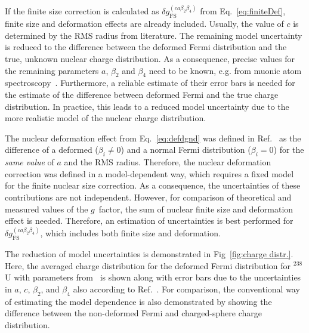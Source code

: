 If the finite size correction is calculated as $\delta g^{(ca\beta_2\beta_4)}_{\text{FS}}$ from Eq.~\eqref{eq:finiteDef}, finite size and deformation effects are already included. Usually, the value of $c$ is determined by the RMS radius from literature. The remaining model uncertainty is reduced to the difference between the deformed Fermi distribution and the true, unknown nuclear charge distribution. As a consequence, precise values for the remaining parameters $a$, $\beta_2$ and $\beta_4$ need to be known, e.g. from muonic atom spectroscopy~\cite{Close1978,hitlin1970}. Furthermore, a reliable estimate of their error bars is needed for the estimate of the difference between deformed Fermi and the true charge distribution. In practice, this leads to a reduced model uncertainty due to the more realistic model of the nuclear charge distribution.

The nuclear deformation effect from Eq.~\eqref{eq:defdgnd} was defined in Ref.~\cite{jacek2012} as the difference of a deformed ($\beta_i \neq 0$) and a normal Fermi distribution ($\beta_i=0$) for the \textit{same value} of $a$ and the RMS radius. 
Therefore, the nuclear deformation correction was defined in a model-dependent way, which requires a fixed model for the finite nuclear size correction. As a consequence, the uncertainties of these contributions are not independent. 
However, for comparison of theoretical and measured values of the $g$~factor, the sum of nuclear finite size and deformation effect is needed. Therefore, an estimation of uncertainties is best performed for $\delta g^{(ca\beta_2\beta_4)}_{\text{FS}}$, which includes both finite size and deformation.
 
The reduction of model uncertainties is demonstrated in Fig~\ref{fig:charge distr.}. Here, the averaged charge distribution for the deformed Fermi distribution for $^{238}$U with parameters from~\cite{jacek2012} is shown along with error bars due to the uncertainties in $a$, $c$, $\beta_2$, and $\beta_4$ also according to Ref.~\cite{jacek2012}. For comparison, the conventional way of estimating the model dependence is also demonstrated by showing the difference between the non-deformed Fermi and charged-sphere charge distribution.

